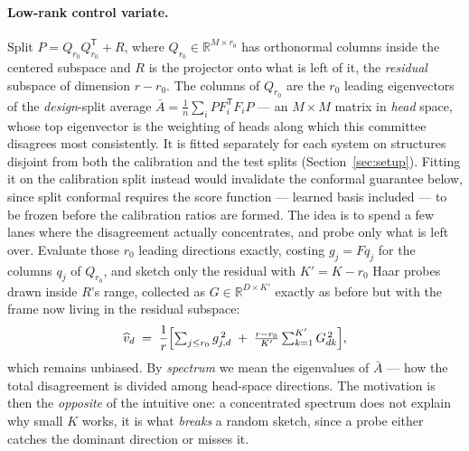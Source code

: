 \documentclass{article}
\begin{document}
\paragraph{Low-rank control variate.}
Split $P = Q_{r_0}Q_{r_0}^{\mathsf T} + R$, where $Q_{r_0}\in\mathbb{R}^{M\times r_0}$ has
orthonormal columns inside the centered subspace and $R$ is the projector onto what is left of it,
the \emph{residual} subspace of dimension $r-r_0$. The columns of $Q_{r_0}$ are the $r_0$ leading
eigenvectors of the \emph{design}-split average $\bar A=\tfrac1n\sum_i PF_i^{\mathsf T}F_iP$ --- an
$M\times M$ matrix in \emph{head} space, whose top eigenvector is the weighting of heads along which
this committee disagrees most consistently. It is fitted separately for
each system on structures disjoint from both the calibration and the test splits
(Section~\ref{sec:setup}). Fitting it on the calibration split instead would invalidate the conformal
guarantee below, since split conformal requires the score function --- learned basis included --- to
be frozen before the calibration ratios are formed. The idea is to spend a few lanes where the disagreement actually concentrates, and probe only what
is left over. Evaluate those $r_0$ leading directions exactly, costing $g_j=Fq_j$ for the columns
$q_j$ of $Q_{r_0}$, and sketch only the residual with $K'=K-r_0$ Haar probes drawn inside $R$'s
range, collected as $G\in\mathbb{R}^{D\times K'}$ exactly as before but with the frame now living in
the residual subspace:
\begin{equation}
\widehat v_d \;=\; \frac{1}{r}\Bigl[\textstyle\sum_{j\le r_0} g_{j,d}^{\,2} \;+\; \frac{r-r_0}{K'}\sum_{k=1}^{K'} G_{dk}^{\,2}\Bigr],
\end{equation}
which remains unbiased. By \emph{spectrum} we mean the eigenvalues of $\bar A$ --- how the total
disagreement is divided among head-space directions. The motivation is then the \emph{opposite} of
the intuitive one: a concentrated spectrum does not explain why small $K$ works, it is what
\emph{breaks} a random sketch, since a probe either catches the dominant direction or misses it.
\end{document}
